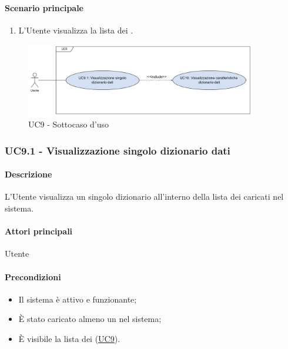 \paragraph*{Scenario principale}
\begin{enumerate}
  \item L'Utente visualizza la lista dei .
\end{enumerate}

\begin{figure}[H]
  \centering
  \includegraphics[width=0.90\textwidth]{assets/uc9_1.png}
  \caption{UC9 - Sottocaso d'uso}
\end{figure}


\subsubsection{UC9.1 - Visualizzazione singolo dizionario dati}\label{UC9point1}
\paragraph*{Descrizione}
L'Utente visualizza un singolo dizionario all'interno della lista dei  caricati nel sistema.

\paragraph*{Attori principali}
Utente

\paragraph*{Precondizioni}
\begin{itemize}
  \item Il sistema è attivo e funzionante;
  \item È stato caricato almeno un  nel sistema;
  \item È visibile la lista dei  (\hyperref[UC9]{UC9}).
\end{itemize}

